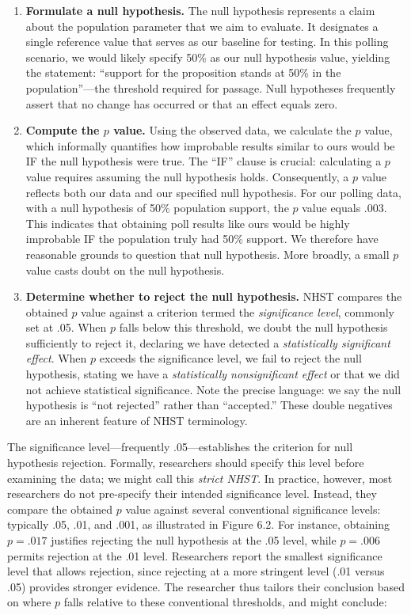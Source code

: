\documentclass[
  letterpaper,
  DIV=11,
  numbers=noendperiod]{scrreprt}
\begin{document}
\begin{enumerate}
\def\labelenumi{\arabic{enumi}.}
\item
  \textbf{Formulate a null hypothesis.} The null hypothesis represents a
  claim about the population parameter that we aim to evaluate. It
  designates a single reference value that serves as our baseline for
  testing. In this polling scenario, we would likely specify 50\% as our
  null hypothesis value, yielding the statement: ``support for the
  proposition stands at 50\% in the population''---the threshold
  required for passage. Null hypotheses frequently assert that no change
  has occurred or that an effect equals zero.
\item
  \textbf{Compute the \(p\) value.} Using the observed data, we
  calculate the \(p\) value, which informally quantifies how improbable
  results similar to ours would be IF the null hypothesis were true. The
  ``IF'' clause is crucial: calculating a \(p\) value requires assuming
  the null hypothesis holds. Consequently, a \(p\) value reflects both
  our data and our specified null hypothesis. For our polling data, with
  a null hypothesis of 50\% population support, the \(p\) value equals
  .003. This indicates that obtaining poll results like ours would be
  highly improbable IF the population truly had 50\% support. We
  therefore have reasonable grounds to question that null hypothesis.
  More broadly, a small \(p\) value casts doubt on the null hypothesis.
\item
  \textbf{Determine whether to reject the null hypothesis.} NHST
  compares the obtained \(p\) value against a criterion termed the
  \emph{significance level}, commonly set at .05. When \(p\) falls below
  this threshold, we doubt the null hypothesis sufficiently to reject
  it, declaring we have detected a \emph{statistically significant
  effect}. When \(p\) exceeds the significance level, we fail to reject
  the null hypothesis, stating we have a \emph{statistically
  nonsignificant effect} or that we did not achieve statistical
  significance. Note the precise language: we say the null hypothesis is
  ``not rejected'' rather than ``accepted.'' These double negatives are
  an inherent feature of NHST terminology.
\end{enumerate}

The significance level---frequently .05---establishes the criterion for
null hypothesis rejection. Formally, researchers should specify this
level before examining the data; we might call this \emph{strict NHST}.
In practice, however, most researchers do not pre-specify their intended
significance level. Instead, they compare the obtained \(p\) value
against several conventional significance levels: typically .05, .01,
and .001, as illustrated in Figure 6.2. For instance, obtaining
\(p = .017\) justifies rejecting the null hypothesis at the .05 level,
while \(p = .006\) permits rejection at the .01 level. Researchers
report the smallest significance level that allows rejection, since
rejecting at a more stringent level (.01 versus .05) provides stronger
evidence. The researcher thus tailors their conclusion based on where
\(p\) falls relative to these conventional thresholds, and might
conclude:
\end{document}
